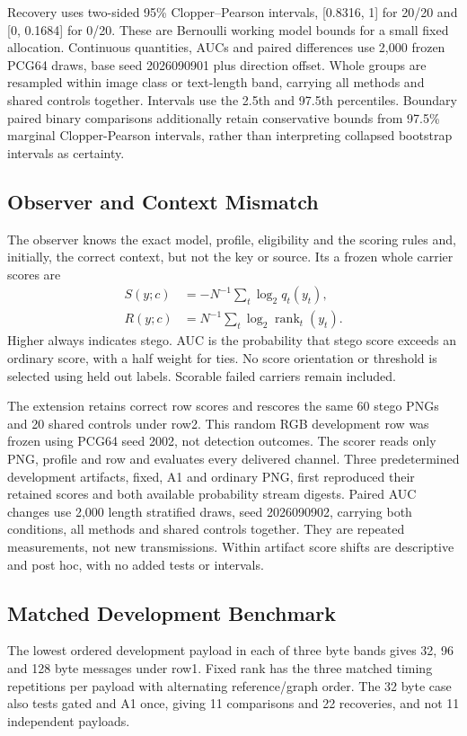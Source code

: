 \documentclass[a4paper,twoside]{article}
\newcommand{\rank}{\operatorname{rank}}
\begin{document}
Recovery uses two-sided 95\% Clopper--Pearson intervals, [0.8316, 1] for 20/20 and [0, 0.1684] for 0/20. These are Bernoulli working model bounds for a small fixed allocation. Continuous quantities, AUCs and paired differences use 2,000 frozen PCG64 draws, base seed 2026090901 plus direction offset. Whole groups are resampled within image class or text-length band, carrying all methods and shared controls together. Intervals use the 2.5th and 97.5th percentiles. Boundary paired binary comparisons additionally retain conservative bounds from 97.5\% marginal Clopper-Pearson intervals, rather than interpreting collapsed bootstrap intervals as certainty.

\subsection{Observer and Context Mismatch}
\label{sec:observer}
The observer knows the exact model, profile, eligibility and the scoring rules and, initially, the correct context, but not the key or source. Its a frozen whole carrier scores are
\begin{align}
S(y;c)&=-N^{-1}\sum_t\log_2 q_t(y_t),\\
R(y;c)&=N^{-1}\sum_t\log_2\rank_t(y_t).
\end{align}
Higher always indicates stego. AUC is the probability that stego score exceeds an ordinary score, with a half weight for ties. No score orientation or threshold is selected using held out labels. Scorable failed carriers remain included.

The extension retains correct row scores and rescores the same 60 stego PNGs and 20 shared controls under row2. This random RGB development row was frozen using PCG64 seed 2002, not detection outcomes. The scorer reads only PNG, profile and row and evaluates every delivered channel. Three predetermined development artifacts, fixed, A1 and ordinary PNG, first reproduced their retained scores and both available probability stream digests. Paired AUC changes use 2,000 length stratified draws, seed 2026090902, carrying both conditions, all methods and shared controls together. They are repeated measurements, not new transmissions. Within artifact score shifts are descriptive and post hoc, with no added tests or intervals.

\subsection{Matched Development Benchmark}
The lowest ordered development payload in each of three byte bands gives 32, 96 and 128 byte messages under row1. Fixed rank has the three matched timing repetitions per payload with alternating reference/graph order. The 32 byte case also tests gated and A1 once, giving 11 comparisons and 22 recoveries, and not 11 independent payloads.
\end{document}
